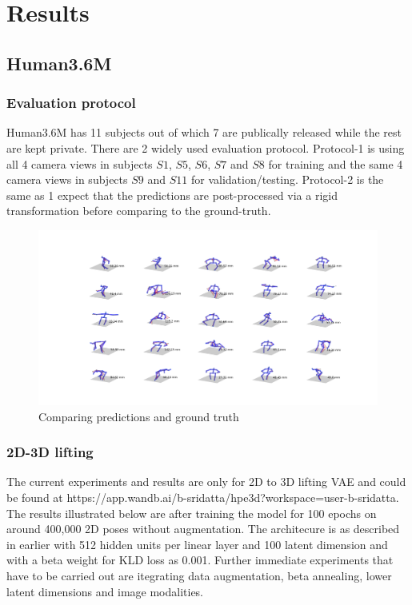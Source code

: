 \chapter{Results}

\section{Human3.6M}
\subsection{Evaluation protocol}
Human3.6M has 11 subjects out of which 7 are publically released while the rest are kept private. There are 2 widely used evaluation protocol. Protocol-1 is using all 4 camera views in subjects $S1$, $S5$, $S6$, $S7$ and $S8$ for training and the 
same 4 camera views in subjects $S9$ and $S11$ for validation/testing. Protocol-2 is the same as 1 expect that the predictions are post-processed via a rigid transformation
before comparing to the ground-truth.

\begin{figure}[h]
    \centering
    \includegraphics[width=\textwidth]{figures/results25_66mm.png}
    \caption{Comparing predictions and ground truth}
    \label{fig:results25}
\end{figure}

\subsection{2D-3D lifting}
The current experiments and results are only for 2D to 3D lifting \ac{VAE} and could be found at https://app.wandb.ai/b-sridatta/hpe3d?workspace=user-b-sridatta. The results illustrated below are after training the model for 100 epochs on around 400,000 2D poses without augmentation. The architecure is as described in earlier with 512 hidden units per linear layer and 100 latent dimension and with a beta weight for \ac{KLD} loss as 0.001. Further immediate experiments that have to be carried out are itegrating data augmentation, beta annealing, lower latent dimensions and image modalities. 

